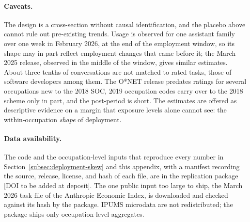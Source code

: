 \documentclass[12pt]{article}
\theoremstyle{plain}
\theoremstyle{definition}
\theoremstyle{remark}
\begin{document}
\paragraph{Caveats.}
The design is a cross-section without causal identification, and the
placebo above cannot rule out pre-existing trends. Usage is observed for one assistant family
over one week in February 2026, at the end of the employment window, so
its shape may in part reflect employment changes that came before it; the
March 2025 release, observed in the middle of the window, gives similar
estimates. About three tenths of conversations are not matched to rated
tasks, those of software developers among them. The O*NET release
predates ratings for several occupations new to the 2018 SOC, 2019
occupation codes carry over to the 2018 scheme only in part, and the
post-period is short. The estimates are offered as descriptive evidence on
a margin that exposure levels alone cannot see: the within-occupation
\emph{shape} of deployment.

\paragraph{Data availability.}
The code and the occupation-level inputs that reproduce every number in
Section~\ref{subsec:deployment-skew} and this appendix, with a manifest
recording the source, release, license, and hash of each file, are in
the replication package [DOI to be added at deposit]. The one public
input too large to ship, the March 2026 task file of the Anthropic
Economic Index, is downloaded and checked against its hash by the
package. IPUMS microdata are not redistributed; the package ships only
occupation-level aggregates.
\end{document}
